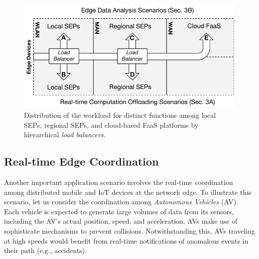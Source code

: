 \begin{figure}[tbp]
	\centering
	\includegraphics[width=\linewidth]{Figs/Edge_Load_Placement}
	\caption{Distribution of the workload for distinct functions among local SEPs, regional SEPs, and cloud-based FaaS platforms by hierarchical \textit{load balancers}.}
	\label{fig:Edge_Load_Placement}
\end{figure}




\subsection{Real-time Edge Coordination}\label{sec:SEP_RTEC}


Another important application scenario involves the real-time coordination among distributed mobile and IoT devices at the network edge. To illustrate this scenario, let us consider the coordination among \textit{Autonomous Vehicles} (AV). Each vehicle is expected to generate large volumes of data from its sensors, including the AV's actual position, speed, and acceleration. AVs make use of sophisticate mechanisms to prevent collisions. Notwithstanding this, AVs traveling at high speeds would benefit from real-time notifications of anomalous events in their path (e.g., accidents). 

